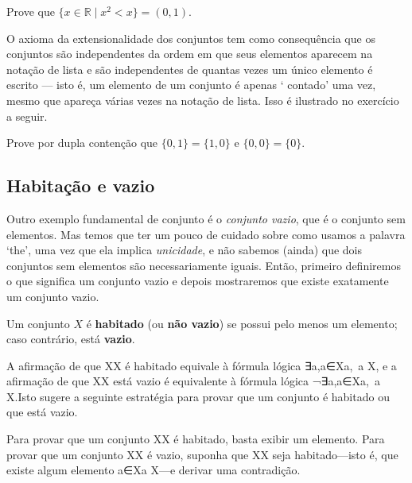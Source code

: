 \begin{exercise}
Prove que $\{ x \in \mathbb{R} \mid x^2 < x \} = (0,1)$.
\end{exercise}

O axioma da extensionalidade dos conjuntos tem como consequência que os conjuntos são independentes da ordem em que seus elementos aparecem na notação de lista e são independentes de quantas vezes um único elemento é escrito --- isto é, um elemento de um conjunto é apenas ` contado' uma vez, mesmo que apareça várias vezes na notação de lista. Isso é ilustrado no exercício a seguir.

\begin{exercise}
Prove por dupla contenção que $\{ 0, 1 \} = \{ 1, 0 \}$ e $\{ 0, 0 \} = \{ 0 \}$.
\end{exercise}

\subsection*{Habitação e vazio}

Outro exemplo fundamental de conjunto é o \textit{conjunto vazio}, que é o conjunto sem elementos. Mas temos que ter um pouco de cuidado sobre como usamos a palavra `the', uma vez que ela implica \textit{unicidade}, e não sabemos (ainda) que dois conjuntos sem elementos são necessariamente iguais. Então, primeiro definiremos o que significa um conjunto vazio e depois mostraremos que existe exatamente um conjunto vazio.

\begin{definition}
\label{defInhabited}
\label{defEmptyProperty}
Um conjunto $X$ é \textbf{habitado} (ou \textbf{não vazio}) se possui pelo menos um elemento; caso contrário, está \textbf{vazio}.
\end{definition}

A afirmação de que XX é habitado equivale à fórmula lógica ∃a,a∈X\exists a,\, a \in X, e a afirmação de que XX está vazio é equivalente à fórmula lógica ¬∃a,a∈X\neg \exists a,\, a \in X.Isto sugere a seguinte estratégia para provar que um conjunto é habitado ou que está vazio.

\begin{strategy}
Para provar que um conjunto XX é habitado, basta exibir um elemento. Para provar que um conjunto XX é vazio, suponha que XX seja habitado---isto é, que existe algum elemento a∈Xa \in X---e derivar uma contradição.
\end{strategy}

